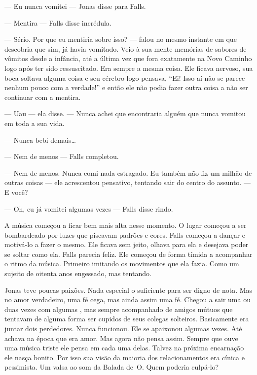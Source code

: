 --- Eu nunca vomitei --- Jonas disse para Falls.

--- Mentira --- Falls disse incrédula.

--- Sério. Por que eu mentiria sobre isso? --- falou no mesmo instante em que descobria que sim, já havia vomitado. Veio à sua mente memórias de sabores de vômitos desde a infância, até a última vez que fora exatamente na Novo Caminho logo após ter sido ressuscitado. Era sempre a mesma coisa. Ele ficava nervoso, sua boca soltava alguma coisa\mudanca{,} e seu cérebro logo pensava, ``Ei! Isso aí não se parece nenhum pouco com a verdade!''\mudanca{,} e então ele não podia fazer outra coisa a não ser continuar com a mentira.

--- Uau --- ela disse. --- Nunca achei que encontraria alguém que nunca vomitou em toda a sua vida.

--- Nunca bebi demais\ldots

--- Nem de menos --- Falls completou.

--- Nem de menos. Nunca comi nada estragado. Eu também não fiz um milhão de outras coisas --- ele acrescentou pensativo, tentando sair do centro do assunto. --- E você?

--- Oh, eu já vomitei algumas vezes --- Falls disse rindo.

A música começou a ficar bem mais alta nesse momento. O lugar começou a ser bombardeado por luzes  que piscavam  padrões e cores. Falls começou a dançar e motivá-lo a fazer o mesmo. Ele ficava sem jeito, olhava para ela e desejava poder se soltar como ela. Falls parecia feliz. Ele começou de forma tímida a acompanhar o ritmo da música. Primeiro imitando os movimentos que ela fazia. Como um sujeito de oitenta anos\mudanca{,} engessado, mas tentando.

Jonas teve poucas paixões. Nada especial o suficiente para ser digno de nota. Mas  no amor verdadeiro, uma fé cega, mas ainda assim uma fé. Chegou a sair uma ou duas vezes com algumas , mas sempre acompanhado de amigos mútuos que tentavam de alguma forma ser cupidos de seus colegas solteiros. Basicamente\mudanca{,} era juntar dois perdedores. Nunca funcionou. Ele se apaixonou algumas vezes. Até achava\mudanca{,} na época\mudanca{,} que era amor. Mas\mudanca{,} agora não pensa assim. Sempre que ouve uma música triste ele pensa em cada uma delas. Talvez na próxima encarnação ele nasça bonito. Por isso sua visão da maioria dos relacionamentos era cínica e pessimista. Um valsa ao som da Balada de~O. Quem poderia culpá-lo?

